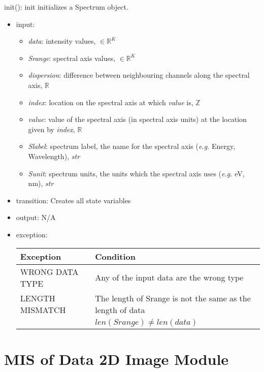 \documentclass[12pt, titlepage]{article}
\begin{document}
\noindent init():
init initializes a Spectrum object.
\begin{itemize}
    \item input:
    \begin{itemize}
        \item \textit{data}: intensity values, $\in \mathbb{R}^K$
        \item \textit{Srange}: spectral axis values, $\in \mathbb{R}^K$
        \item \textit{dispersion}: difference  between neighbouring channels along the spectral axis,  $\mathbb{R}$
        \item \textit{index}: location on the spectral axis at which \textit{value} is, $\mathbb{Z}$
        \item \textit{value}: value of the spectral axis (in spectral axis units) at the location given by \textit{index}, $\mathbb{R}$
        \item \textit{Slabel}: spectrum label, the name for the spectral axis (\textit{e.g.} Energy, Wavelength), \textit{str}
        \item \textit{Sunit}: spectrum units, the units which the spectral axis uses (\textit{e.g.} \si{\electronvolt}, \si{\nano\metre}), \textit{str}
    \end{itemize}
    \item transition: Creates all state variables
    \item output: N/A
    \item exception:
\begin{center}
    \begin{tabular}{p{3cm} p{12cm}}
        \toprule[0.15em]
        \textbf{Exception} & \textbf{Condition}\\
        \midrule[0.1em]
        WRONG DATA TYPE & Any of the input data are the wrong type\\ 
        \midrule[0.05em]
        LENGTH MISMATCH & The length of Srange is not the same as the length of data\\
        & $len(Srange) \neq len(data)$\\
        \bottomrule[0.15em]
    \end{tabular}
\end{center}
\end{itemize}

\section{MIS of Data 2D Image Module} \label{Mod:Image}
\end{document}
